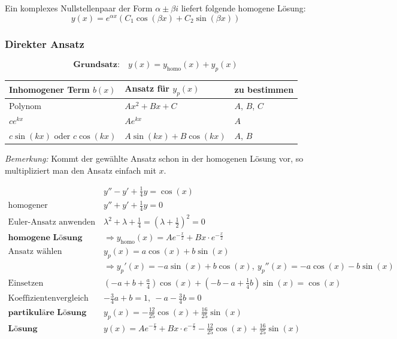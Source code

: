 \documentclass[11pt]{article}
\begin{document}
Ein komplexes Nullstellenpaar der Form $\alpha \pm \beta i$ liefert folgende homogene L{\"o}sung:
\begin{equation*}
	y(x)=e^{\alpha x}(C_1\cos(\beta x) + C_2\sin(\beta x))
\end{equation*}

\subsubsection{Direkter Ansatz}

\begin{equation*}
	\textbf{Grundsatz:}\quad y(x) = y_\text{homo}(x) + y_p(x)
\end{equation*}

\begin{table}[H]
\centering
\begin{tabular}{|l|l|l|}
\hline
\textbf{Inhomogener Term $b(x)$} & \textbf{Ansatz f{\"u}r $y_p(x)$}	& \textbf{zu bestimmen}		\\ \hline
Polynom				& $Ax^2 + Bx + C$			& $A$, $B$, $C$		\\ \hline
$c e^{k x}$ & $Ae^{kx}$					& $A$				\\ \hline
$c\sin(kx)$ oder $c\cos(kx)$ & $A\sin(kx) + B\cos(kx)$ & $A$, $B$ \\ \hline

\end{tabular}
\end{table}

\emph{Bemerkung:} Kommt der gew{\"a}hlte Ansatz schon in der homogenen L{\"o}sung vor, so multipliziert man den Ansatz einfach mit $x$.

\begin{equation*}
\begin{split}
	& y'' - y' + \frac{1}{4}y = \cos(x) \\
	\text{homogener}\quad & y'' + y' + \frac{1}{4}y = 0 \\
	\text{Euler-Ansatz anwenden}\quad & \lambda^2 + \lambda + \frac{1}{4} = (\lambda + \frac{1}{2})^2 = 0 \\
	\textbf{homogene L{\"o}sung}\quad &\Rightarrow y_\text{homo}(x) = Ae^{-\frac{x}{2}} + Bx \cdot e^{-\frac{x}{2}} \\
	\text{Ansatz w{\"a}hlen}\quad & y_p(x) = a\cos(x) + b\sin(x) \\
							  & \Rightarrow y_p'(x) = -a\sin(x) + b\cos(x),\  y_p''(x) = -a\cos(x) -b \sin(x) \\
	\text{Einsetzen}\quad & (-a + b + \frac{a}{4})\cos(x) + (-b -a + \frac{1}{4}b)\sin(x) = \cos(x) \\
	\text{Koeffizientenvergleich}\quad & -\frac{3}{4}a + b = 1,\ -a-\frac{3}{4}b = 0 \\
	\textbf{partikul{\"a}re L{\"o}sung}\quad & y_p(x) = -\frac{12}{25}\cos(x) + \frac{16}{25}\sin(x) \\
	\textbf{L{\"o}sung}\quad & y(x) = Ae^{-\frac{x}{2}} + Bx \cdot e^{-\frac{x}{2}} -\frac{12}{25}\cos(x) + \frac{16}{25}\sin(x)
\end{split}
\end{equation*}
\end{document}
